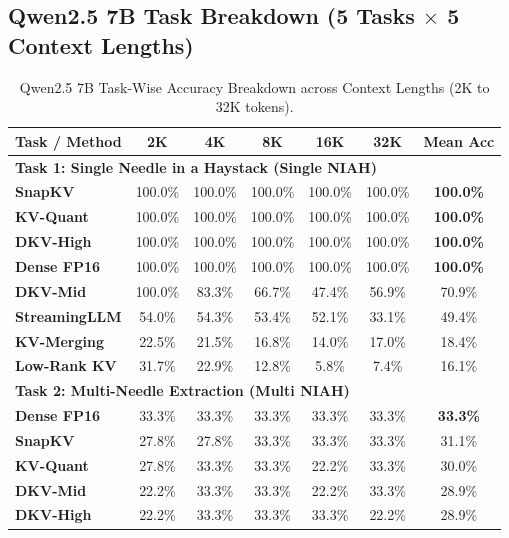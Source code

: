 \documentclass[10pt]{article}
\theoremstyle{definition}
\begin{document}
\clearpage
\subsection{Qwen2.5 7B Task Breakdown (5 Tasks \texorpdfstring{$\times$}{x} 5 Context Lengths)}

\begin{table}[h]
\vspace{6pt}
\centering
\small
\caption{Qwen2.5 7B Task-Wise Accuracy Breakdown across Context Lengths (2K to 32K tokens).}
\label{tab:q7b_task_breakdown}
\begin{tabular}{lcccccc}
\toprule
\textbf{Task / Method} & \textbf{2K} & \textbf{4K} & \textbf{8K} & \textbf{16K} & \textbf{32K} & \textbf{Mean Acc} \\
\midrule
\multicolumn{7}{l}{\textbf{Task 1: Single Needle in a Haystack (Single NIAH)}} \\
\textbf{SnapKV} & 100.0\% & 100.0\% & 100.0\% & 100.0\% & 100.0\% & \textbf{100.0\%} \\
\textbf{KV-Quant} & 100.0\% & 100.0\% & 100.0\% & 100.0\% & 100.0\% & \textbf{100.0\%} \\
\textbf{DKV-High} & 100.0\% & 100.0\% & 100.0\% & 100.0\% & 100.0\% & \textbf{100.0\%} \\
\textbf{Dense FP16} & 100.0\% & 100.0\% & 100.0\% & 100.0\% & 100.0\% & \textbf{100.0\%} \\
\textbf{DKV-Mid} & 100.0\% & 83.3\% & 66.7\% & 47.4\% & 56.9\% & 70.9\% \\
\textbf{StreamingLLM} & 54.0\% & 54.3\% & 53.4\% & 52.1\% & 33.1\% & 49.4\% \\
\textbf{KV-Merging} & 22.5\% & 21.5\% & 16.8\% & 14.0\% & 17.0\% & 18.4\% \\
\textbf{Low-Rank KV} & 31.7\% & 22.9\% & 12.8\% & 5.8\% & 7.4\% & 16.1\% \\
\midrule
\multicolumn{7}{l}{\textbf{Task 2: Multi-Needle Extraction (Multi NIAH)}} \\
\textbf{Dense FP16} & 33.3\% & 33.3\% & 33.3\% & 33.3\% & 33.3\% & \textbf{33.3\%} \\
\textbf{SnapKV} & 27.8\% & 27.8\% & 33.3\% & 33.3\% & 33.3\% & 31.1\% \\
\textbf{KV-Quant} & 27.8\% & 33.3\% & 33.3\% & 22.2\% & 33.3\% & 30.0\% \\
\textbf{DKV-Mid} & 22.2\% & 33.3\% & 33.3\% & 22.2\% & 33.3\% & 28.9\% \\
\textbf{DKV-High} & 22.2\% & 33.3\% & 33.3\% & 33.3\% & 22.2\% & 28.9\% \\

\end{tabular}
\end{table}
\end{document}
